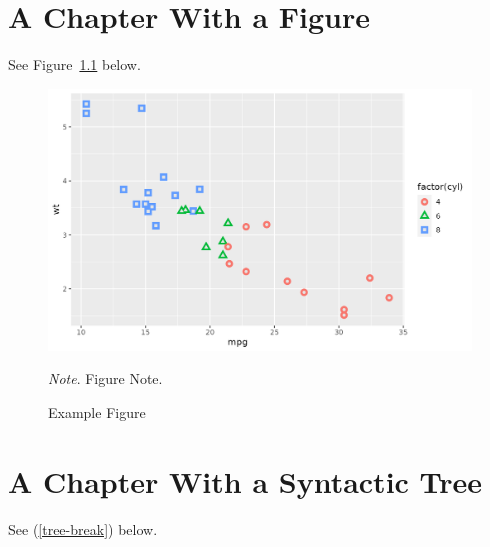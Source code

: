 \documentclass[
  12pt,
  letterpaper,
]{report}
\begin{document}
\hypertarget{a-chapter-with-a-figure}{%
\chapter{A Chapter With a Figure}\label{a-chapter-with-a-figure}}

See Figure~\ref{fig-example} below.

\begin{figure}

{\centering 

\includegraphics{image/example.png}

\hypertarget{fig-example-1}{}
\raggedright

\textit{Note}. Figure Note.

}

\caption{\label{fig-example}Example Figure}

\end{figure}

\hypertarget{a-chapter-with-a-syntactic-tree}{%
\chapter{A Chapter With a Syntactic
Tree}\label{a-chapter-with-a-syntactic-tree}}

See (\ref{tree-break}) below.
\end{document}
